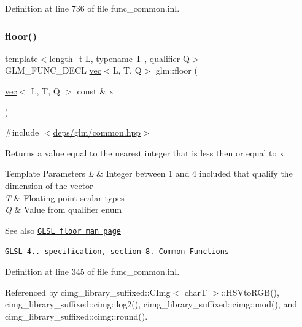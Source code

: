 Definition at line 736 of file func\+\_\+common.\+inl.

\mbox{\label{group__core__func__common_gaa9d0742639e85b29c7c5de11cfd6840d}} 
\subsubsection{\texorpdfstring{floor()}{floor()}}
{\footnotesize\ttfamily template$<$length\+\_\+t L, typename T , qualifier Q$>$ \\
G\+L\+M\+\_\+\+F\+U\+N\+C\+\_\+\+D\+E\+CL \hyperlink{structglm_1_1vec}{vec}$<$L, T, Q$>$ glm\+::floor (\begin{DoxyParamCaption}\item[{\hyperlink{structglm_1_1vec}{vec}$<$ L, T, Q $>$ const \&}]{x }\end{DoxyParamCaption})}



{\ttfamily \#include $<$\hyperlink{common_8hpp}{deps/glm/common.\+hpp}$>$}

Returns a value equal to the nearest integer that is less then or equal to x.


\begin{DoxyTemplParams}{Template Parameters}
{\em L} & Integer between 1 and 4 included that qualify the dimension of the vector \\
\hline
{\em T} & Floating-\/point scalar types \\
\hline
{\em Q} & Value from qualifier enum\\
\hline
\end{DoxyTemplParams}
\begin{DoxySeeAlso}{See also}
\href{http://www.opengl.org/sdk/docs/manglsl/xhtml/floor.xml}{\tt G\+L\+SL floor man page} 

\href{http://www.opengl.org/registry/doc/GLSLangSpec.4.20.8.pdf}{\tt G\+L\+SL 4.. specification, section 8. Common Functions} 
\end{DoxySeeAlso}


Definition at line 345 of file func\+\_\+common.\+inl.



Referenced by cimg\+\_\+library\+\_\+suffixed\+::\+C\+Img$<$ char\+T $>$\+::\+H\+S\+Vto\+R\+G\+B(), cimg\+\_\+library\+\_\+suffixed\+::cimg\+::log2(), cimg\+\_\+library\+\_\+suffixed\+::cimg\+::mod(), and cimg\+\_\+library\+\_\+suffixed\+::cimg\+::round().

